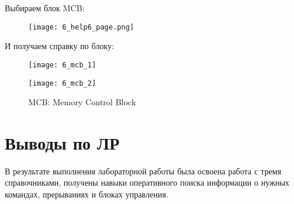Выбираем блок MCB:
\begin{figure}[H]
  \begin{center}
    \texttt{[image: 6\_help6\_page.png]}
    \caption{}
    \label{pic:pic_name}
  \end{center}
\end{figure}

И получаем справку по блоку:
\begin{figure}[H]
  \begin{center}
    \texttt{[image: 6\_mcb\_1]}
  \end{center}
  \begin{center}
    \texttt{[image: 6\_mcb\_2]}
    \caption{MCB: Memory Control Block}
    \label{pic:pic_name}
  \end{center}
\end{figure}

\section{Выводы по ЛР}
В результате выполнения лабораторной работы была освоена работа с тремя справочниками,
получены навыки оперативного поиска информации о нужных командах, прерываниях и блоках
управления.
